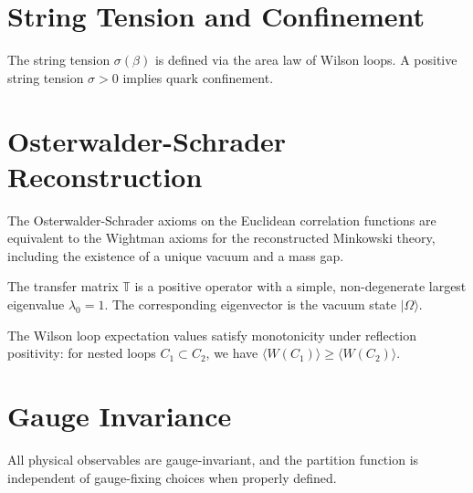 \section{String Tension and Confinement}
\label{sec:string}

\begin{definition}
The string tension $\sigma(\beta)$ is defined via the area law of Wilson loops. A positive string tension $\sigma > 0$ implies quark confinement.
\end{definition}

\section{Osterwalder-Schrader Reconstruction}
\label{sec:osterwalder}

\begin{theorem}[OS Reconstruction]
The Osterwalder-Schrader axioms on the Euclidean correlation functions are equivalent to the Wightman axioms for the reconstructed Minkowski theory, including the existence of a unique vacuum and a mass gap.
\end{theorem}

\begin{theorem}
\label{thm:perron-frobenius}
The transfer matrix $\mathbb{T}$ is a positive operator with a simple, non-degenerate largest eigenvalue $\lambda_0 = 1$. The corresponding eigenvector is the vacuum state $|\Omega\rangle$.
\end{theorem}

\begin{theorem}[RP Monotonicity]
\label{thm:rp-monotonicity}
The Wilson loop expectation values satisfy monotonicity under reflection positivity: for nested loops $C_1 \subset C_2$, we have $\langle W(C_1) \rangle \ge \langle W(C_2) \rangle$.
\end{theorem}

\section{Gauge Invariance}
\label{sec:gauge-invariance}

\begin{theorem}
All physical observables are gauge-invariant, and the partition function is independent of gauge-fixing choices when properly defined.
\end{theorem}


